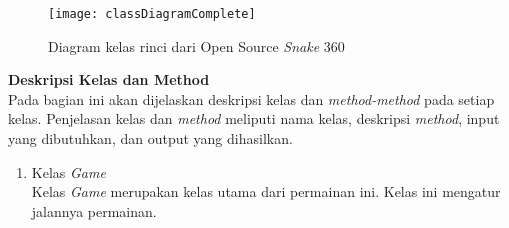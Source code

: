 \begin{figure}[H]
	\centering  
	\texttt{[image: classDiagramComplete]}  
	\caption[Diagram class rinci dari Open Source \textit{Snake} 360]{Diagram kelas rinci dari Open Source \textit{Snake} 360}
	\label{fig:classDiagramComplete} 
\end{figure}

\textbf{Deskripsi Kelas dan Method}\\

Pada bagian ini akan dijelaskan deskripsi kelas dan \textit{method-method} pada setiap kelas. Penjelasan kelas dan \textit{method} meliputi nama kelas, deskripsi \textit{method}, input yang dibutuhkan, dan output yang dihasilkan. 

\begin{enumerate}
	\item Kelas \textit{Game} \\
	Kelas \textit{Game} merupakan kelas utama dari permainan ini. Kelas ini mengatur jalannya permainan.
		

\end{enumerate}
